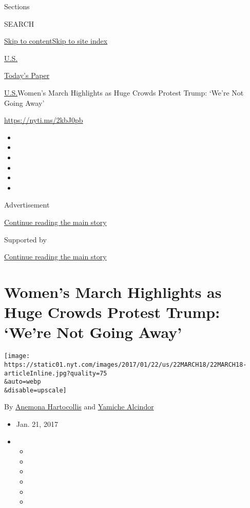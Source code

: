 Sections

SEARCH

\protect\hyperlink{site-content}{Skip to
content}\protect\hyperlink{site-index}{Skip to site index}

\href{https://www.nytimes.com/section/us}{U.S.}

\href{https://myaccount.nytimes.com/auth/login?response_type=cookie\&client_id=vi}{}

\href{https://www.nytimes.com/section/todayspaper}{Today's Paper}

\href{/section/us}{U.S.}\textbar{}Women's March Highlights as Huge
Crowds Protest Trump: `We're Not Going Away'

\href{https://nyti.ms/2kbJ0pb}{https://nyti.ms/2kbJ0pb}

\begin{itemize}
\item
\item
\item
\item
\item
\item
\end{itemize}

Advertisement

\protect\hyperlink{after-top}{Continue reading the main story}

Supported by

\protect\hyperlink{after-sponsor}{Continue reading the main story}

\hypertarget{womens-march-highlights-as-huge-crowds-protest-trump-were-not-going-away}{%
\section{Women's March Highlights as Huge Crowds Protest Trump: `We're
Not Going
Away'}\label{womens-march-highlights-as-huge-crowds-protest-trump-were-not-going-away}}

\texttt{[image: https://static01.nyt.com/images/2017/01/22/us/22MARCH18/22MARCH18-articleInline.jpg?quality=75\\\&auto=webp\\\&disable=upscale]}

By \href{http://www.nytimes.com/by/anemona-hartocollis}{Anemona
Hartocollis} and
\href{http://www.nytimes.com/by/yamiche-alcindor}{Yamiche Alcindor}

\begin{itemize}
\item
  Jan. 21, 2017
\item
  \begin{itemize}
  \item
  \item
  \item
  \item
  \item
  \item
  \end{itemize}
\end{itemize}

